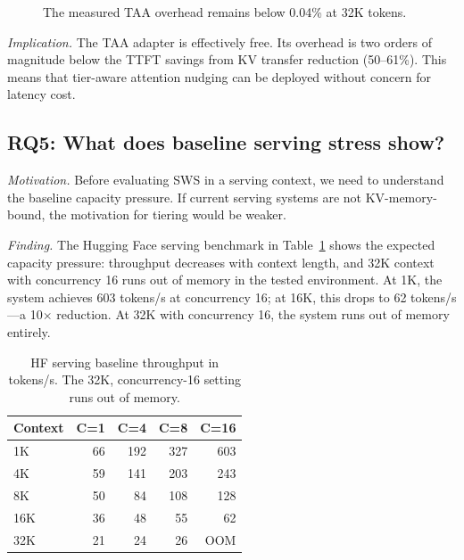 \documentclass[11pt]{article}
\newcommand{\method}{SWS}
\newcommand{\taa}{TAA}
\newcommand{\pct}{\%}
\theoremstyle{definition}
\theoremstyle{plain}
\begin{document}
\begin{figure}[t]
\centering
{}
\caption{The measured \taa{} overhead remains below 0.04\pct{} at 32K tokens.}
\label{fig:taa-overhead}
\end{figure}

\emph{Implication.}  The \taa{} adapter is effectively free.  Its overhead is two orders of magnitude below the TTFT savings from KV transfer reduction (50--61\pct{}).  This means that tier-aware attention nudging can be deployed without concern for latency cost.

\subsection{RQ5: What does baseline serving stress show?}
\label{sec:rq5}

\emph{Motivation.}  Before evaluating \method{} in a serving context, we need to understand the baseline capacity pressure.  If current serving systems are not KV-memory-bound, the motivation for tiering would be weaker.

\emph{Finding.}  The Hugging Face serving benchmark in Table~\ref{tab:hf-serving} shows the expected capacity pressure: throughput decreases with context length, and 32K context with concurrency 16 runs out of memory in the tested environment.  At 1K, the system achieves 603 tokens/s at concurrency 16; at 16K, this drops to 62 tokens/s---a 10$\times$ reduction.  At 32K with concurrency 16, the system runs out of memory entirely.

\begin{table}[t]
\centering
\caption{HF serving baseline throughput in tokens/s.  The 32K, concurrency-16 setting runs out of memory.}
\label{tab:hf-serving}
\small
\begin{tabular}{lrrrr}
\toprule
Context & C=1 & C=4 & C=8 & C=16 \\
\midrule
1K & 66 & 192 & 327 & 603 \\
4K & 59 & 141 & 203 & 243 \\
8K & 50 & 84 & 108 & 128 \\
16K & 36 & 48 & 55 & 62 \\
32K & 21 & 24 & 26 & OOM \\
\bottomrule
\end{tabular}
\end{table}
\end{document}
